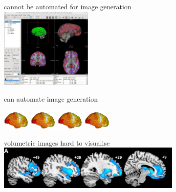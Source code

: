 \documentclass[10pt,xcolor=table,aspectratio=169]{beamer}
\begin{document}
\begin{frame}[t]
\begin{figure}
\begin{subfigure}[t]{0.3\textwidth}
\end{subfigure}
\begin{subfigure}[t]{0.3\textwidth}
\centering
 \begin{minipage}[t][3.5cm][t]{\textwidth}
 \centering
\myno cannot be automated for image generation\\
\includegraphics[width=0.5\textwidth]{images/freeviewInterface.jpg}
 \end{minipage}


\myyes can automate image generation

\includegraphics[height=1cm,trim=0 0 900 0]{images/brainTransparent} 
\includegraphics[height=1cm,trim=0 0 900 0]{images/brainTransparent} 
\includegraphics[height=1cm,trim=0 0 900 0]{images/brainTransparent} 
\includegraphics[height=1cm]{images/brainTransparent} 



\end{subfigure}
\begin{subfigure}[t]{0.3\textwidth}
\centering
 \begin{minipage}[t][3.5cm][t]{\textwidth}
 \centering
\myno volumetric images hard to visualise\\
\vspace{1.5em}
\includegraphics[width=\textwidth]{images/seeleyImages} 
\vspace{1.0em}
 \end{minipage}



\end{subfigure}
\end{figure}
\end{frame}
\end{document}
